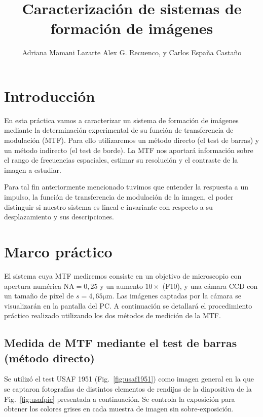 \documentclass{./packages/optica-article}
\begin{document}
\title{Caracterización de sistemas de formación de imágenes}

\author{Adriana Mamani Lazarte Alex G. Recuenco, y Carlos España Castaño}

\address{Universidad Complutense de Madrid, Madrid, CP 28040, España}

\section{Introducción}
En esta práctica vamos a caracterizar un sistema de formación de imágenes mediante la determinación experimental de su función de transferencia de modulación (MTF). Para ello utilizaremos un método directo (el test de barras) y un método indirecto (el test de borde). La MTF nos aportará información sobre el rango de frecuencias espaciales, estimar su resolución y el contraste de la imagen a estudiar.

Para tal fin anteriormente mencionado tuvimos que entender la respuesta a un impulso, la función de transferencia de modulación de la imagen, el poder distinguir si nuestro sistema es lineal e invariante con respecto a su desplazamiento y sus descripciones.

\section{Marco práctico}
El sistema cuya MTF mediremos consiste en un objetivo de microscopio con apertura numérica $\textrm{NA} = 0,25$ y un aumento $10\times$ (F10),
y una cámara CCD con un tamaño de píxel de $s=4,65 \unit{\micro\meter}$.
Las imágenes captadas por la cámara se visualizarán en la pantalla del PC.
A continuación se detallará el procedimiento práctico realizado utilizando los dos métodos de medición de la MTF.

\subsection{Medida de MTF mediante el test de barras (método directo)}\label{sec:metodo-directo}

Se utilizó el test USAF 1951 (Fig.~\ref{fig:usaf1951}) como imagen general en la que se captaron fotografías de  distintos elementos de rendijas de la diapositiva de la Fig.~\ref{fig:usafpic} presentada a continuación. Se controla la exposición para obtener los colores grises en cada muestra de imagen sin sobre-exposición.
\end{document}
